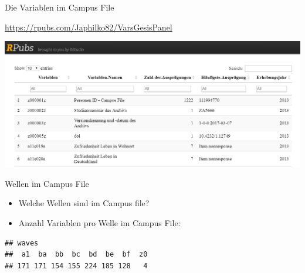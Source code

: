\documentclass[ignorenonframetext,]{beamer}
\providecommand{\tightlist}{%
  \setlength{\itemsep}{0pt}\setlength{\parskip}{0pt}}
\begin{document}
\begin{frame}{Die Variablen im Campus File}

\url{https://rpubs.com/Japhilko82/VarsGesisPanel}

\includegraphics{figure/rpubs_varspuf.PNG}

\end{frame}

\begin{frame}[fragile]{Wellen im Campus File}

\begin{itemize}
\tightlist
\item
  Welche Wellen sind im Campus file?
\item
  Anzahl Variablen pro Welle im Campus File:
\end{itemize}

\begin{verbatim}
## waves
##  a1  ba  bb  bc  bd  be  bf  z0 
## 171 171 154 155 224 185 128   4
\end{verbatim}

\end{frame}
\end{document}
